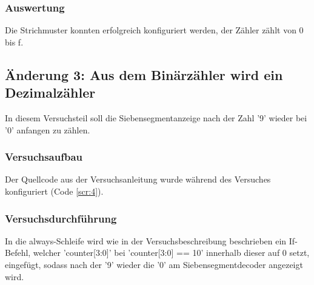 \documentclass[12pt,a4paper]{article}
\begin{document}
\subsubsection*{Auswertung}
Die Strichmuster konnten erfolgreich konfiguriert werden, der Zähler zählt von 0 bis f.
\subsection{Änderung 3: Aus dem Binärzähler wird ein Dezimalzähler}
In diesem Versuchsteil soll die Siebensegmentanzeige nach der Zahl '9' wieder bei '0' anfangen zu zählen.
\subsubsection*{Versuchsaufbau}
Der Quellcode aus der Versuchsanleitung wurde während des Versuches konfiguriert (Code \ref{scr:4}).
\subsubsection*{Versuchsdurchführung}
In die always-Schleife wird wie in der Versuchsbeschreibung beschrieben ein If-Befehl, welcher 'counter[3:0]' bei 'counter[3:0] == 10' innerhalb dieser auf 0 setzt, eingefügt, sodass nach der '9' wieder die '0' am Siebensegmentdecoder angezeigt wird.  
\end{document}
